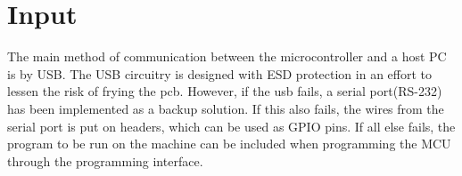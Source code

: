 \documentclass[../main/report.tex]{subfiles}
\begin{document}
\section{Input}

The main method of communication between the microcontroller and a host PC is by USB.
The USB circuitry is designed with ESD protection in an effort to lessen the risk of frying the pcb. 
However, if the usb fails, a serial port(RS-232) has been implemented as a backup solution.
If this also fails, the wires from the serial port is put on headers, which can be used as GPIO pins.
If all else fails, the program to be run on the machine can be included when programming the MCU through the programming interface. 

\end{document}

